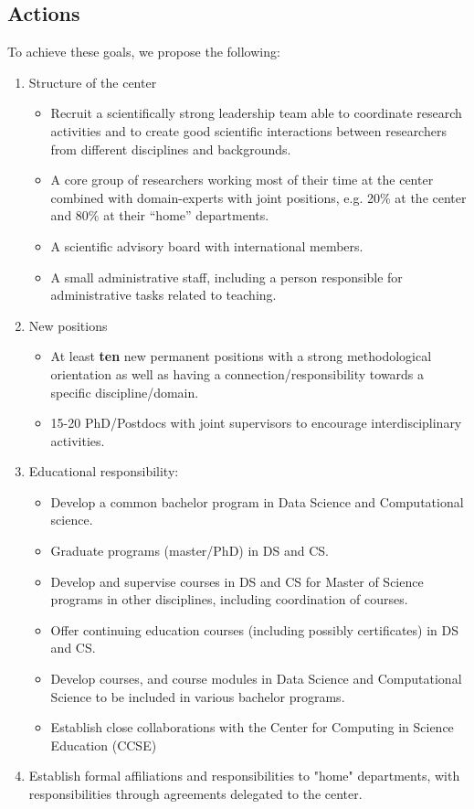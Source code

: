 \documentclass[a4paper,10pt]{article}
\begin{document}
\subsection{Actions}
To achieve these goals, we propose the following:
\begin{enumerate}
\item Structure of the center
\begin{itemize}
\item Recruit a  scientifically strong leadership team able to coordinate research activities and to create good scientific interactions between researchers from different disciplines and backgrounds. 
\item A core group of researchers working most of their time at the center combined with domain-experts with joint positions, e.g. 20\% at the center and 80\% at their ``home'' departments.
\item A scientific advisory board with international members.
\item A small administrative staff, including a person responsible for administrative tasks related to teaching.
\end{itemize}
\item New positions
\begin{itemize}
\item At least {\bf ten} new permanent positions with a strong methodological orientation as well as  having a connection/responsibility towards a specific discipline/domain.
\item 15-20 PhD/Postdocs with joint supervisors to encourage interdisciplinary activities.
\end{itemize}
\item Educational responsibility:
\begin{itemize}
\item Develop a common bachelor program  in Data Science and Computational science.
\item Graduate programs (master/PhD) in DS and CS.
\item Develop and supervise courses in DS and CS for Master of Science programs in other disciplines, including coordination of courses.
\item Offer continuing education courses (including possibly certificates) in DS and CS.
\item Develop courses, and course modules in Data Science and Computational Science to be included in various bachelor programs. 

\item Establish close collaborations with the Center for Computing in Science Education (CCSE) 
\end{itemize}
\item Establish formal affiliations and responsibilities to "home" departments, with  responsibilities through agreements delegated to the center. 
\end{enumerate}
\end{document}
